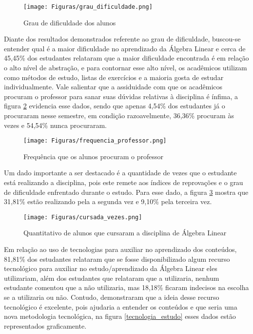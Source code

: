 \begin{figure}[!htb]
  \centering 
  \texttt{[image: Figuras/grau\_dificuldade.png]}
  \caption{Grau de dificuldade dos alunos}\label{grau_dificuldade}
\end{figure}
 
Diante dos resultados demonstrados referente ao grau de dificuldade, buscou-se entender qual é a maior dificuldade no aprendizado da Álgebra Linear e cerca de 45,45\% dos estudantes relataram que a maior dificuldade encontrada é em relação o alto nível de abstração, e para contornar esse alto nível, os acadêmicos utilizam como métodos de estudo, listas de exercícios e a maioria gosta de estudar individualmente. Vale salientar que a assiduidade com que os acadêmicos procuram o professor para sanar suas dúvidas relativas à disciplina é ínfima, a figura \ref{frequencia_procura_professor} evidencia esse dados, sendo que apenas 4,54\% dos estudantes já o procuraram nesse semestre, em condição razoavelmente, 36,36\% procuram às vezes e 54,54\% nunca procuraram.

\begin{figure}[!htb]
  \centering 
  \texttt{[image: Figuras/frequencia\_professor.png]}
  \caption{Frequência que os alunos procuram o professor}\label{frequencia_procura_professor}
\end{figure}

Um dado importante a ser destacado é a quantidade de vezes que o estudante está realizando a disciplina, pois este remete aos índices de reprovações e o grau de dificuldade enfrentado durante o estudo. Para esse dado, a figura \ref{numero_alunos_cursaram_vezes} mostra que 31,81\% estão realizando pela a segunda vez e 9,10\% pela terceira vez.

\begin{figure}[!htb]
  \centering 
  \texttt{[image: Figuras/cursada\_vezes.png]}
  \caption{Quantitativo de alunos que cursaram a disciplina de Álgebra Linear}\label{numero_alunos_cursaram_vezes}
\end{figure}

Em relação ao uso de tecnologias para auxiliar no aprendizado dos conteúdos, 81,81\% dos estudantes relataram que se fosse disponibilizado algum recurso tecnológico para auxiliar no estudo/aprendizado da Álgebra Linear eles utilizariam, além dos estudantes que relataram que a utilizaria, nenhum estudante comentou que a não utilizaria, mas 18,18\% ficaram indecisos na escolha se a utilizaria ou não. Contudo, demonstraram que a ideia desse recurso tecnológico é excelente, pois ajudaria a entender os conteúdos e que seria uma nova metodologia tecnológica, na figura \ref{tecnologia_estudo} esses dados estão representados graficamente. 

